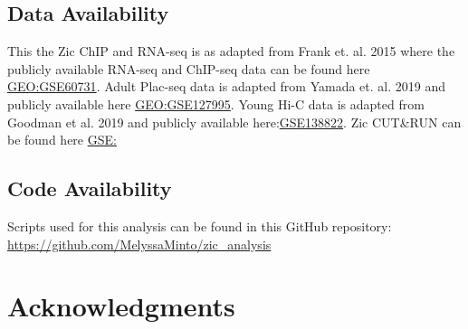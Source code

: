 \documentclass[fleqn,10pt]{wlscirep}
\begin{document}
\subsection*{Data Availability}
This the Zic ChIP and RNA-seq is as adapted from Frank et. al. 2015 \cite{Frank2015RegulationCerebellum} where the publicly available RNA-seq and ChIP-seq  data can be found here \href{https://www.ncbi.nlm.nih.gov/geo/query/acc.cgi?acc=GSE60731}{GEO:GSE60731}. Adult Plac-seq data is adapted from Yamada et. al. 2019 \cite{Yamada2019SensoryLearning} and publicly available here \href{https://www.ncbi.nlm.nih.gov/geo/query/acc.cgi?acc=GSE127995}{GEO:GSE127995}. Young Hi-C data is adapted from Goodman et al. 2019 \cite{Goodman2020TheBrain} and publicly available here:\href{https://www.ncbi.nlm.nih.gov/geo/query/acc.cgi?acc=GSE138822}{GSE138822}. Zic CUT&RUN can be found here \href{}{GSE:}

\subsection*{Code Availability}
Scripts used for this analysis can be found in this GitHub repository: \href{https://github.com/MelyssaMinto/zic_analysis}{https://github.com/MelyssaMinto/zic_analysis}

\section*{Acknowledgments}

\clearpage

\clearpage


\beginsupplement
\end{document}
